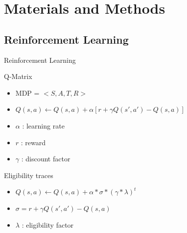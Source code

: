 \documentclass{bredelebeamer}
\begin{document}
\section{Materials and Methods}
\subsection{Reinforcement Learning}
\begin{frame}{Reinforcement Learning}

\begin{block}{Q-Matrix}
\begin{itemize}
\item MDP =  $< S, A, T, R >$
\item $Q(s, a) \leftarrow  Q(s, a) +  \alpha [r + \gamma Q(s', a') - Q(s,a)]$
\item $\alpha$ : learning rate
\item $r$ : reward
\item $\gamma$ : discount factor
\end{itemize}
\end{block}

\begin{block}{Eligibility traces}
\begin{itemize}
\item $Q(s, a) \leftarrow  Q(s, a) +  \alpha *  \sigma *  (\gamma * \lambda)^t$
\item $\sigma = r + \gamma Q(s', a') - Q(s,a)$
\item $\lambda$ : eligibility factor
\end{itemize}
\end{block}

\end{frame}
\end{document}
